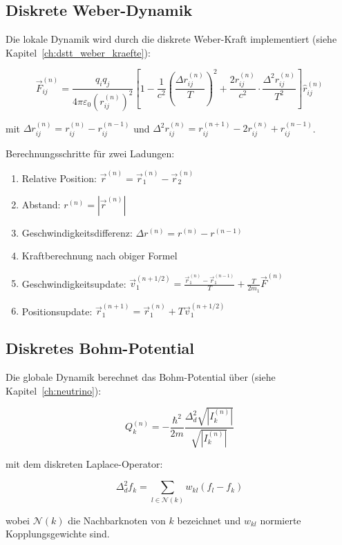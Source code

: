\subsection{Diskrete Weber-Dynamik}
\label{sub:numerik_weber}

Die lokale Dynamik wird durch die diskrete Weber-Kraft implementiert (siehe Kapitel~\ref{ch:dstt_weber_kraefte}):

\[
\vec{F}_{ij}^{(n)} = \frac{q_i q_j}{4\pi \varepsilon_0 (r_{ij}^{(n)})^2} \left[ 1 - \frac{1}{c^2} \left( \frac{\Delta r_{ij}^{(n)}}{T} \right)^2 + \frac{2r_{ij}^{(n)}}{c^2} \cdot \frac{\Delta^2 r_{ij}^{(n)}}{T^2} \right] \hat{r}_{ij}^{(n)}
\]

mit \( \Delta r_{ij}^{(n)} = r_{ij}^{(n)} - r_{ij}^{(n-1)} \) und \( \Delta^2 r_{ij}^{(n)} = r_{ij}^{(n+1)} - 2r_{ij}^{(n)} + r_{ij}^{(n-1)} \).

Berechnungsschritte für zwei Ladungen:

\begin{enumerate}
    \item Relative Position: \( \vec{r}^{(n)} = \vec{r}_1^{(n)} - \vec{r}_2^{(n)} \)
    \item Abstand: \( r^{(n)} = |\vec{r}^{(n)}| \)
    \item Geschwindigkeitsdifferenz: \( \Delta r^{(n)} = r^{(n)} - r^{(n-1)} \)
    \item Kraftberechnung nach obiger Formel
    \item Geschwindigkeitsupdate: \( \vec{v}_1^{(n+1/2)} = \frac{\vec{r}_1^{(n)} - \vec{r}_1^{(n-1)}}{T} + \frac{T}{2m_1} \vec{F}^{(n)} \)
    \item Positionsupdate: \( \vec{r}_1^{(n+1)} = \vec{r}_1^{(n)} + T \vec{v}_1^{(n+1/2)} \)
\end{enumerate}

\subsection{Diskretes Bohm-Potential}
\label{sub:numerik_bohm}

Die globale Dynamik berechnet das Bohm-Potential über (siehe Kapitel~\ref{ch:neutrino}):

\[
Q_k^{(n)} = -\frac{\hbar^2}{2m} \frac{\Delta_d^2 \sqrt{|I_k^{(n)}|}}{\sqrt{|I_k^{(n)}|}}
\]

mit dem diskreten Laplace-Operator:

\[
\Delta_d^2 f_k = \sum_{l \in \mathcal{N}(k)} w_{kl} (f_l - f_k)
\]

wobei \( \mathcal{N}(k) \) die Nachbarknoten von \( k \) bezeichnet und \( w_{kl} \) normierte Kopplungsgewichte sind.

